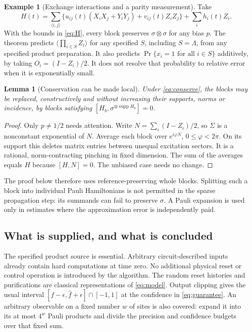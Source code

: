 \documentclass[11pt,reqno]{amsart}
\numberwithin{equation}{section}
\newtheorem{lemma}[theorem]{Lemma}
\theoremstyle{definition}
\newtheorem{example}[theorem]{Example}
\theoremstyle{remark}
\newcommand{\supp}{\operatorname{supp}}
\begin{document}
\begin{example}[Exchange interactions and a parity measurement]
Take
\[
 H(t)=\sum_{\langle i,j\rangle}
 \{u_{ij}(t)(X_iX_j+Y_iY_j)+v_{ij}(t)Z_iZ_j\}
 +\sum_i h_i(t)Z_i.
\]
With the bounds in \eqref{eq:H}, every block preserves $\sigma\otimes\sigma$ for any bias $p$. The theorem predicts $\langle\prod_{i\in S}Z_i\rangle$ for any specified $S$, including $S=\Lambda$, from any specified product preparation. It also predicts $\Pr\{x_i=1\text{ for all }i\in S\}$ additively, by taking $O_i=(I-Z_i)/2$. It does not resolve that probability to relative error when it is exponentially small.
\end{example}

\begin{lemma}[Conservation can be made local]\label{lem:twirl}
Under \eqref{eq:conserve}, the blocks may be replaced, constructively and without increasing their supports, norms or incidence, by blocks satisfying
$[H_b,\sigma^{\otimes\supp H_b}]=0$.
\end{lemma}
\begin{proof}
Only $p\ne1/2$ needs attention. Write $N=\sum_i(I-Z_i)/2$, so $\Sigma$ is a nonconstant exponential of $N$. Average each block over $e^{i\varphi N}$, $0\leq\varphi<2\pi$. On its support this deletes matrix entries between unequal excitation sectors. It is a rational, norm-contracting pinching in fixed dimension. The sum of the averages equals $H$ because $[H,N]=0$. The unbiased case needs no change.
\end{proof}

The proof below therefore uses reference-preserving whole blocks. Splitting such a block into individual Pauli Hamiltonians is not permitted in the sparse propagation step: its summands can fail to preserve $\sigma$. A Pauli expansion is used only in estimates where the approximation error is independently paid.

\subsection{What is supplied, and what is concluded}
The specified product source is essential. Arbitrary circuit-described inputs already contain hard computations at time zero. No additional physical reset or control operation is introduced by the algorithm. The random reset histories and purifications are classical representations of \eqref{eq:model}. Output clipping gives the usual interval $[\widehat f-\epsilon,\widehat f+\epsilon]\cap[-1,1]$ at the confidence in \eqref{eq:guarantee}. An arbitrary observable on a fixed number $w$ of sites is also covered: expand it into its at most $4^w$ Pauli products and divide the precision and confidence budgets over that fixed sum.
\end{document}
